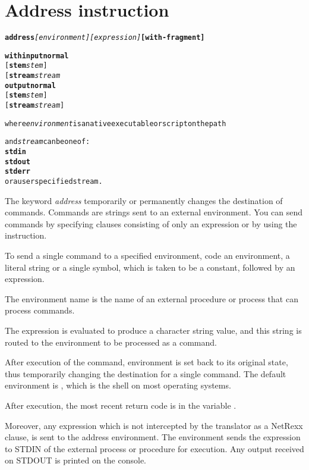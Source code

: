 \chapter{Address instruction}\label{refaddress}
\begin{shaded}
  \begin{alltt}
  \textbf{address} \emph{[environment]} \emph{[expression]} \textbf{[with - fragment]}

  \textbf{with} \textbf{input} \textbf{normal}
                [\textbf{stem} \emph{stem}]
                [\textbf{stream} \emph{stream}
       \textbf{output} \textbf{normal}
                [\textbf{stem} \emph{stem}]
                [\textbf{stream} \emph{stream}]
                
where \emph{environment} is a native executable or script on the path

and \emph{stream} can be one of:
\textbf{stdin}
\textbf{stdout}
\textbf{stderr}
or a user specified stream.  
\end{alltt}

% 
\end{shaded}
The keyword \emph{address} temporarily or permanently changes the destination of commands. Commands are strings sent to an external environment. You can send commands by specifying clauses consisting of only an expression or by using the  instruction.

To send a single command to a specified environment, code an
environment, a literal string or a single symbol, which is taken to be
a constant, followed by an expression.

The environment name is the
name of an external procedure or process that can process
commands.

The expression is evaluated to produce a character string
value, and this string is routed to the environment to be processed as
a command.

After execution of the command, environment is set back to
its original state, thus temporarily changing the destination for a
single command. The default environment is , which is the shell
on most operating systems.

After execution, the most recent return code is in the variable .

Moreover, any expression which is not intercepted by the translator as a NetRexx clause, is sent to the address environment.
The environment sends the expression to STDIN of the external process or procedure for execution.
Any output received on STDOUT is printed on the console.


